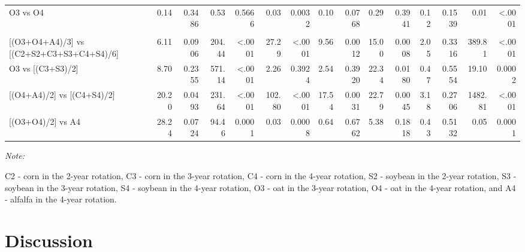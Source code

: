 \documentclass[
]{article}
\begin{document}
\begin{landscape}
\begin{table}[H]
{\begin{threeparttable}
\begin{tabular}[t]{lr>{}r|r>{}r|r>{}r|r>{}r|r>{}r|r>{}r|rr}
\hspace{1em}\hspace{1em}O3 vs O4 & 0.14 & 0.3486 & 0.53 & 0.5666 & 0.03 & 0.0032 & 0.10 & 0.0768 & 0.29 & 0.3941 & 0.12 & 0.1539 & 0.01 & <.0001\\
\addlinespace[0.3em]
\multicolumn{15}{l}{\textbf{(B3) - Crop type effects}}\\
\hspace{1em}\hspace{1em}{}[(O3+O4+A4)/3] vs [(C2+S2+C3+S3+C4+S4)/6] & 6.11 & 0.0906 & 204.44 & <.0001 & 27.29 & <.0001 & 9.56 & 0.0012 & 15.00 & 0.0008 & 2.05 & 0.3316 & 389.81 & <.0001\\
\hspace{1em}\hspace{1em}O3 vs [(C3+S3)/2] & 8.70 & 0.2355 & 571.14 & <.0001 & 2.26 & 0.3924 & 2.54 & 0.3920 & 22.34 & 0.0180 & 0.47 & 0.5554 & 19.10 & 0.0002\\
\hspace{1em}\hspace{1em}{}[(O4+A4)/2] vs [(C4+S4)/2] & 20.20 & 0.0493 & 231.64 & <.0001 & 102.80 & <.0001 & 17.54 & 0.0031 & 22.79 & 0.0045 & 3.18 & 0.2706 & 1482.81 & <.0001\\
\hspace{1em}\hspace{1em}{}[(O3+O4)/2] vs A4 & 28.24 & 0.0724 & 94.46 & 0.0001 & 0.03 & 0.0008 & 0.64 & 0.6762 & 5.38 & 0.1818 & 0.43 & 0.5132 & 0.05 & 0.0001\\
\bottomrule
\end{tabular}
\begin{tablenotes}[para]
\item \textit{Note: } 
\item C2 - corn in the 2-year rotation, C3 - corn in the 3-year rotation, C4 - corn in the 4-year rotation, S2 - soybean in the 2-year rotation, S3 - soybean in the 3-year rotation, S4 - soybean in the 4-year rotation, O3 - oat in the 3-year rotation, O4 - oat in the 4-year rotation, and A4 - alfalfa in the 4-year rotation.
\end{tablenotes}
\end{threeparttable}}
\end{table}
\end{landscape}

\hypertarget{discussion}{%
\section*{Discussion}\label{discussion}}
\end{document}
